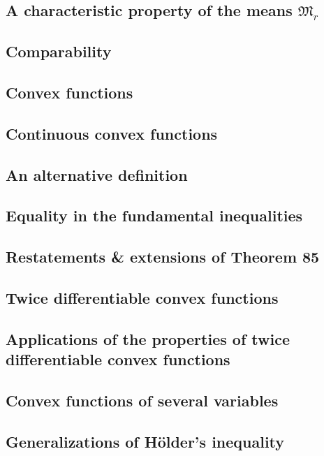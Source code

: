 \documentclass[oneside]{book}
\numberwithin{equation}{section}
\begin{document}
\subsection{A characteristic property of the means $\mathfrak{M}_r$}

\subsection{Comparability}

\subsection{Convex functions}

\subsection{Continuous convex functions}

\subsection{An alternative definition}

\subsection{Equality in the fundamental inequalities}

\subsection{Restatements \& extensions of Theorem 85}

\subsection{Twice differentiable convex functions}

\subsection{Applications of the properties of twice differentiable convex functions}

\subsection{Convex functions of several variables}

\subsection{Generalizations of H\"older's inequality}
\end{document}
